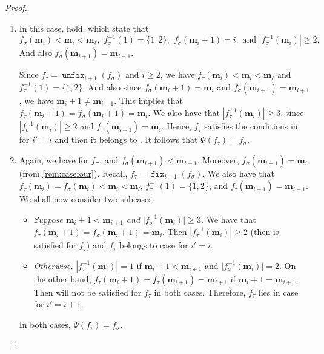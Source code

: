 \documentclass[reqno]{amsart}
\theoremstyle{definition}
\newcommand{\fretherD}{\Psi}
\newcommand{\img}{\mathbf{m}}
\DeclareMathOperator{\fixMap}{\mathtt{fix}}
\DeclareMathOperator{\unfixMap}{\mathtt{unfix}}
\begin{document}
\begin{proof}
\begin{enumerate}[leftmargin=1.6cm]
		
		
	\item[\textbf{Case \caseThree[i]:}] 
	In this case, \eqCond[i] hold, which state that 
	\[
	f_{\sigma}(\img_i) < \img_i < \img_\ell,\,\,
	f^{-1}_\sigma(1) = \{1,2\},\,\, f_\sigma(\img_i+1)=i, \text{ and }
  |f^{-1}_\sigma(\img_i)|\geq 2.
	\]
	And also $f_\sigma(\img_{i+1})=\img_{i+1}$.
	
	\medskip
	\noindent
	Since $f_\tau = \unfixMap_{i+1}(f_\sigma)$ and $i\geq 2$, we have $f_\tau(\img_i)<\img_i<\img_\ell$
	and $f_\tau^{-1}(1)=\{1,2\}$. And also since
	$f_\sigma(\img_i+1)=\img_i$ and  
	$f_\sigma(\img_{i+1})=\img_{i+1}$, we have $\img_i+1\neq \img_{i+1}$. 
	This implies that $f_\tau(\img_i+1)=f_\sigma(\img_i+1)=\img_i$. We also have that $|f_\tau^{-1}(\img_i)| \geq 3$,
	since $|f_\sigma^{-1}(\img_i)|\geq 2$ and $f_\tau(\img_{i+1})=\img_i$. 
	Hence, $f_\tau$ satisfies the conditions in \eqCond[i'] for $i'=i$ and then it belongs to \caseFour[i'].
	It follows that $\fretherD(f_\tau)=f_\sigma$.	
		\item[\textbf{Case \caseFour[i]:}] 
		Again, we have \eqCond[i] for $f_\sigma$, and $f_\sigma(\img_{i+1})<\img_{i+1}$. 
		Moreover,  $f_\sigma(\img_{i+1})=\img_{i}$ (from \cref{rem:casefour}).
		Recall, $f_\tau = \fixMap_{i+1}(f_\sigma)$. We also have that $f_\tau(\img_i)=f_\sigma(\img_i)<\img_i<\img_l$, $f_\tau^{-1}(1)=\{1,2\}$, and $f_\tau(\img_{i+1})=\img_{i+1}$. 
		We shall now consider two subcases.
		\begin{itemize}
			\item \emph{Suppose $\img_i+1< \img_{i+1}$ and $\vert f_\sigma^{-1}(\img_i)\vert\geq 3$.} We have that 
			$f_\tau(\img_i+1)=f_\sigma(\img_i+1)=\img_i$. Then $|f_\tau^{-1}(\img_i)|\geq 2$ (then \eqCond[i] is satisfied for $f_\tau$) and $f_\tau$ belongs to case \caseThree[i'] for $i'=i$.
			\item \emph{Otherwise,}  $|f_\tau^{-1}(\img_i)|=1$ if $\img_i+1< \img_{i+1}$ and $\vert f_\sigma^{-1}(\img_i)\vert=2$. On the other hand, $f_\tau(\img_i+1)=f_\tau(\img_{i+1})=\img_{i+1}$ if $\img_i+1=\img_{i+1}$.  Then \eqCond[i] will not be satisfied for $f_\tau$ in both cases. Therefore, $f_\tau$ lies in case \caseOne[i'] for $i'=i+1$.
		\end{itemize}
	In both cases, $\fretherD(f_\tau)=f_\sigma$.
	\end{enumerate}
\end{proof}
\end{document}
